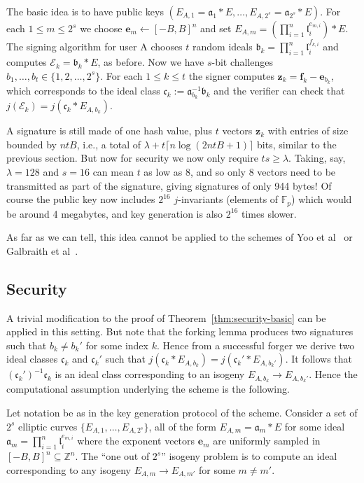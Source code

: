 \documentclass{llncs}
\newcommand{\E}{\mathcal{E}}
\newcommand{\F}{\mathbb{F}}
\newcommand{\Z}{\mathbb{Z}}
\renewcommand{\a}{\mathfrak{a}}
\renewcommand{\b}{\mathfrak{b}}
\renewcommand{\c}{\mathfrak{c}}
\renewcommand{\l}{\mathfrak{l}}
\newcommand{\e}{\mathbf{e}}
\newcommand{\f}{\mathbf{f}}
\newcommand{\z}{\mathbf{z}}
\begin{document}
The basic idea is to have public keys $( E_{A,1} = \a_1 * E , \dots , E_{A,2^s} = \a_{2^s} * E )$.
For each $1 \le m \le 2^s$ we choose $\e_m \leftarrow [-B,B]^n$ and set $E_{A,m} = ( \prod_{i=1}^n \l_i^{e_{m,i}} ) * E$.
The signing algorithm for user A chooses $t$ random ideals $\b_k = \prod_{i=1}^n \l_i^{f_{k,i}}$ and computes $\E_k = \b_k * E$, as before.
Now we have $s$-bit challenges $b_1, \dots, b_t \in \{1, 2, \dots, 2^s \}$.
For each $1 \le k \le t$ the signer computes $\z_k = \f_k - \e_{b_k}$, which corresponds to the ideal class $\c_k := \a_{b_k}^{-1} \b_k$ and the verifier can check that $j( \E_k ) = j( \c_k * E_{A, b_k})$.

A signature is still made of one hash value, plus $t$ vectors $\z_k$ with entries of size bounded by $ntB$, i.e., a total of $\lambda + t\lceil n\log(2ntB + 1)\rceil$ bits, similar to the previous section.
But now for security we now only require $ts \ge \lambda$.
Taking, say, $\lambda = 128$ and $s = 16$ can mean $t$ as low as 8, and so only 8 vectors need to be transmitted as part of the signature, giving signatures of only 944 bytes!
Of course the public key now includes $2^{16}$ $j$-invariants (elements of $\F_p$) which would be around 4 megabytes, and key generation is also $2^{16}$ times slower.


As far as we can tell, this idea cannot be applied to the schemes of Yoo et al~\cite{YAJJS17} or Galbraith et al~\cite{GPS17}.



\subsection{Security}

A trivial modification to the proof of Theorem~\ref{thm:security-basic} can be applied in this setting. But note that the forking lemma produces two signatures such that $b_k \ne b_k'$ for some index $k$.
Hence from a successful forger we derive two ideal classes $\c_k$ and $\c_k'$ such that $j( \c_k * E_{A, b_k} ) = j( \c_k' * E_{A, b_k'})$. It follows that $(\c_k')^{-1} \c_k$ is an ideal class corresponding to an isogeny $E_{A,b_k} \to E_{A,b_k'}$.
Hence the computational assumption underlying the scheme is the following.

\begin{definition}\label{defn:one-out-of-2s-problem}
Let notation be as in the key generation protocol of the scheme.
Consider a set of $2^s$ elliptic curves $\{ E_{A,1}, \dots, E_{A,2^s} \}$, all of the form $E_{A,m} = \a_m * E$ for some ideal $\a_m = \prod_{i=1}^n \l_i^{e_{m,i}}$ where the exponent vectors $\e_m $ are uniformly sampled in $[-B,B]^n \subseteq \Z^n$. The ``one out of $2^s$'' isogeny problem is to compute an ideal corresponding to any isogeny $E_{A,m} \to E_{A,m'}$ for some $m \ne m'$.
\end{definition}
\end{document}
